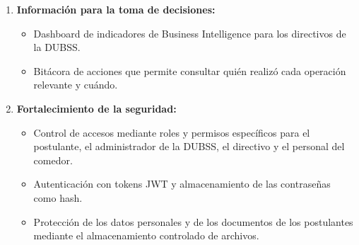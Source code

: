 \begin{enumerate}
    \item \textbf{Información para la toma de decisiones:}
    \begin{itemize}
        \item Dashboard de indicadores de Business Intelligence para los directivos de la DUBSS.
        \item Bitácora de acciones que permite consultar quién realizó cada operación relevante y cuándo.
    \end{itemize}

    \item \textbf{Fortalecimiento de la seguridad:}
    \begin{itemize}
        \item Control de accesos mediante roles y permisos específicos para el postulante, el administrador de la DUBSS, el directivo y el personal del comedor.
        \item Autenticación con tokens JWT y almacenamiento de las contraseñas como hash.
        \item Protección de los datos personales y de los documentos de los postulantes mediante el almacenamiento controlado de archivos.
    \end{itemize}
\end{enumerate}
